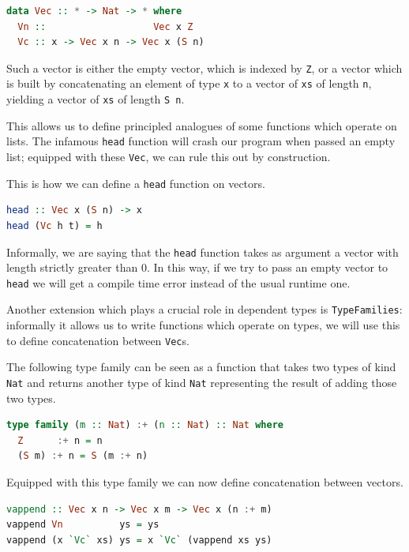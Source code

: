 \documentclass[11pt]{article}
\begin{document}
\begin{lstlisting}[language=haskell]
data Vec :: * -> Nat -> * where
  Vn ::                   Vec x Z
  Vc :: x -> Vec x n -> Vec x (S n)
\end{lstlisting}

Such a vector is either the empty vector, which is indexed by
\texttt{Z}, or a vector which is built by concatenating an element of
type \texttt{x} to a vector of \texttt{xs} of length \texttt{n},
yielding a vector of \texttt{xs} of length \texttt{S\ n}.

This allows us to define principled analogues of some functions which
operate on lists. The infamous \texttt{head} function will
crash our program when passed an empty list; equipped with these \texttt{Vec}, we can rule this
out by construction. 

This is how we can define a \texttt{head} function on vectors.

\begin{lstlisting}[language=haskell]
head :: Vec x (S n) -> x
head (Vc h t) = h
\end{lstlisting}

Informally, we are saying that the \texttt{head} function takes as
argument a vector with length strictly greater than 0. In this way, if we
try to pass an empty vector to \texttt{head} we will get a compile time
error instead of the usual runtime one.

Another extension which plays a crucial role in dependent types is
\texttt{TypeFamilies}: informally it allows us to write functions which operate on types, 
we will use this to define concatenation between \texttt{Vec}s.

The following type family can be seen as a function that takes two types
of kind \texttt{Nat} and returns another type of kind \texttt{Nat}
representing the result of adding those two types.

\begin{lstlisting}[language=haskell]
type family (m :: Nat) :+ (n :: Nat) :: Nat where
  Z      :+ n = n
  (S m) :+ n = S (m :+ n)
\end{lstlisting}

Equipped with this type family we can now define concatenation between
vectors.

\begin{lstlisting}[language=haskell]
vappend :: Vec x n -> Vec x m -> Vec x (n :+ m)
vappend Vn          ys = ys
vappend (x `Vc` xs) ys = x `Vc` (vappend xs ys)
\end{lstlisting}
\end{document}
